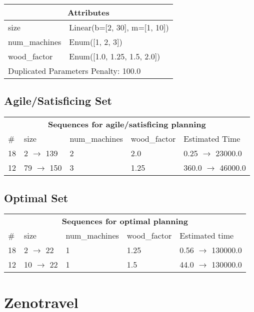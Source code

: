 \documentclass{article}
\begin{document}
                    \begin{center}
                    \begin{tabular}{p{}p{}}
                    \multicolumn{2}{c}{\bf \large Attributes}\\\midrule
                    size & Linear(b=[2, 30], m=[1, 10])\\
num\_machines & Enum([1, 2, 3])\\
wood\_factor & Enum([1.0, 1.25, 1.5, 2.0])
                    
                     \\\midrule
                    \multicolumn{2}{l}{Duplicated Parameters Penalty: 100.0}
                    \end{tabular}
                    \end{center}
                
                         \subsection*{Agile/Satisficing Set}

                        \begin{center}
                        \begin{tabular}{l|l|l|l|l}
                        \multicolumn{5}{c}{\bf \large Sequences for agile/satisficing planning}\\
                        \# & size & num\_machines & wood\_factor & Estimated Time\\\midrule
                        18&2 $\rightarrow$ 139&2&2.0&0.25 $\rightarrow$ 23000.0\\
12&79 $\rightarrow$ 150&3&1.25&360.0 $\rightarrow$ 46000.0
                        \end{tabular}
                        \end{center}
                    
                            \subsection*{Optimal Set}

                            \begin{center}
                            \begin{tabular}{l|l|l|l|l}
                            \multicolumn{5}{c}{\bf \large Sequences for optimal planning}\\
                            \# & size & num\_machines & wood\_factor & Estimated time\\\midrule
                            18&2 $\rightarrow$ 22&1&1.25&0.56 $\rightarrow$ 130000.0\\
12&10 $\rightarrow$ 22&1&1.5&44.0 $\rightarrow$ 130000.0
                            \end{tabular}
                            \end{center}
                    \newpage \section{Zenotravel}
\end{document}
